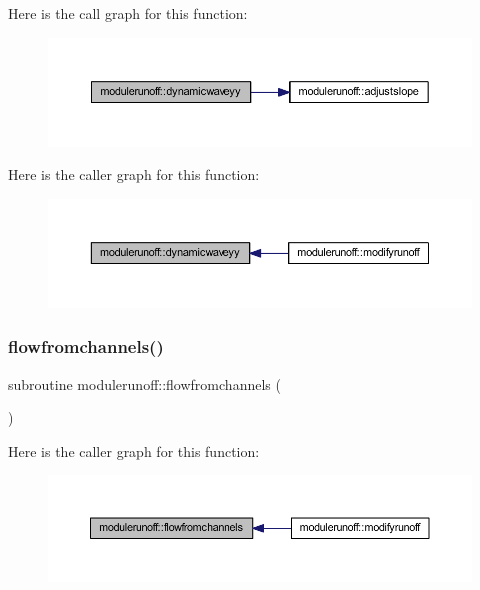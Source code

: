 Here is the call graph for this function\+:
\nopagebreak
\begin{figure}[H]
\begin{center}
\leavevmode
\includegraphics[width=350pt]{namespacemodulerunoff_a86d4b0ce5f4e6efc7d53702b40d97604_cgraph}
\end{center}
\end{figure}
Here is the caller graph for this function\+:
\nopagebreak
\begin{figure}[H]
\begin{center}
\leavevmode
\includegraphics[width=350pt]{namespacemodulerunoff_a86d4b0ce5f4e6efc7d53702b40d97604_icgraph}
\end{center}
\end{figure}
\mbox{\label{namespacemodulerunoff_ad9add85fb1e5efe5eb239bb72e597945}} 
\subsubsection{\texorpdfstring{flowfromchannels()}{flowfromchannels()}}
{\footnotesize\ttfamily subroutine modulerunoff\+::flowfromchannels (\begin{DoxyParamCaption}{ }\end{DoxyParamCaption})\hspace{0.3cm}{\ttfamily [private]}}

Here is the caller graph for this function\+:
\nopagebreak
\begin{figure}[H]
\begin{center}
\leavevmode
\includegraphics[width=350pt]{namespacemodulerunoff_ad9add85fb1e5efe5eb239bb72e597945_icgraph}
\end{center}
\end{figure}
\mbox{\label{namespacemodulerunoff_a08312a51cf0c25b5c2019c42750e1673}} 
